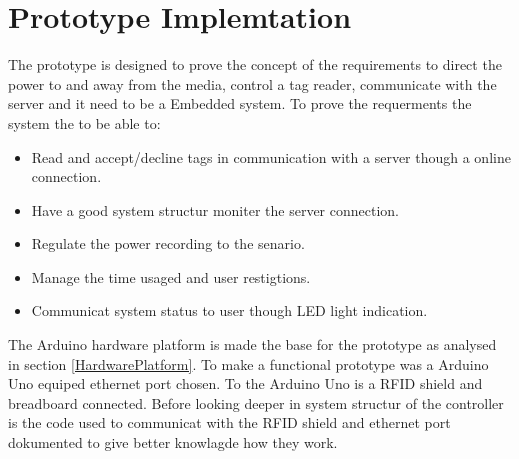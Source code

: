 \section{Prototype Implemtation}
The prototype is designed to prove the concept of the requirements to direct the power to and away from the media, control a tag reader, communicate with the server and it need to be a Embedded system. \newline
To prove the requerments the system the to be able to: 

\begin{itemize}
	\item Read and accept/decline tags in communication with a server though a online connection.
	\item Have a good system structur moniter the server connection.
	\item Regulate the power recording to the senario.
	\item Manage the time usaged and user restigtions. 
	\item Communicat system status to user though LED light indication. 
\end{itemize}

The Arduino hardware platform is made the base for the prototype as analysed in section \ref{HardwarePlatform}.
To make a functional prototype was a Arduino Uno equiped ethernet port chosen. To the Arduino Uno is a RFID shield and breadboard connected.        
Before looking deeper in system structur of the controller is the code used to communicat with the RFID shield and ethernet port dokumented to give better knowlagde how they work.      


    